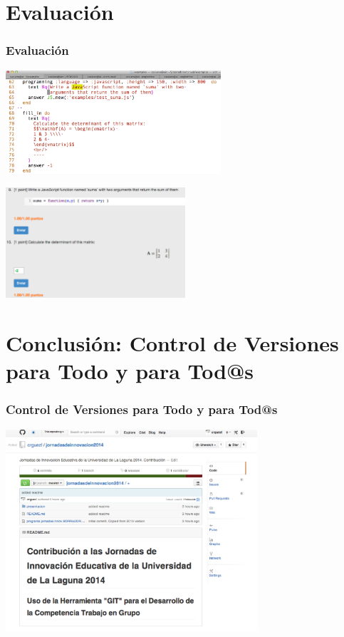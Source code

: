 \documentclass{beamer}
\begin{document}
\section{Evaluación}
\begin{frame}
\frametitle{Evaluación}

    \includegraphics[width=0.6\textwidth]{img/ruqlsrc.eps}

    \includegraphics[width=0.5\textwidth]{img/ruqlbrowser.eps}
\end{frame}

\section{Conclusión: Control de Versiones para Todo y para Tod@s}
\begin{frame}
\frametitle{Control de Versiones para Todo y para Tod@s}

\begin{center}
    \includegraphics[width=0.7\textwidth]{img/estacontribucion.eps}
\end{center}
\end{frame}
\end{document}
